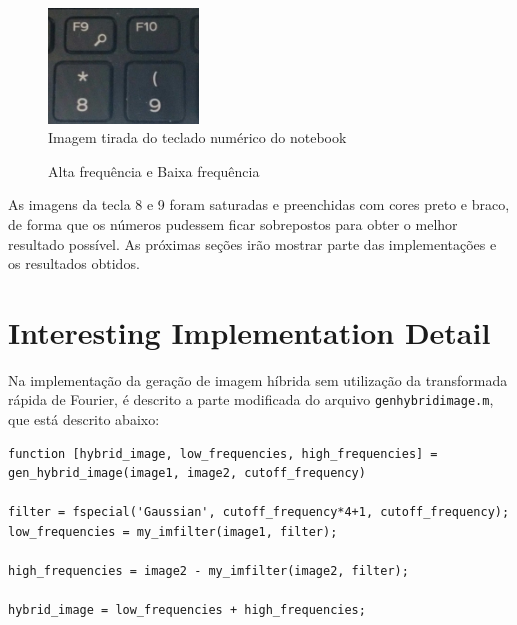 \begin{figure}[H]
    \centering
    \includegraphics[width=4cm]{num.jpg}
    \caption{Imagem tirada do teclado numérico do notebook}
    \label{fig:teclado}
\end{figure}

\begin{figure}[ht]
	\centering
	\caption[]{  Alta frequência e  Baixa frequência }
	\label{fig:teclas}
\end{figure}

As imagens da tecla 8 e 9 foram saturadas e preenchidas com cores preto e braco, de forma que os números pudessem ficar sobrepostos para obter o melhor resultado possível. As próximas seções irão mostrar parte das implementações e os resultados obtidos.

\section*{Interesting Implementation Detail}


Na implementação da geração de imagem híbrida sem utilização da transformada rápida de Fourier, é descrito a parte modificada do arquivo \texttt{gen\textunderscore hybrid\textunderscore image.m}, que está descrito abaixo:

\begin{lstlisting}[style=Matlab-editor]
function [hybrid_image, low_frequencies, high_frequencies] = gen_hybrid_image(image1, image2, cutoff_frequency)

filter = fspecial('Gaussian', cutoff_frequency*4+1, cutoff_frequency);
low_frequencies = my_imfilter(image1, filter);

high_frequencies = image2 - my_imfilter(image2, filter);

hybrid_image = low_frequencies + high_frequencies;
\end{lstlisting}

